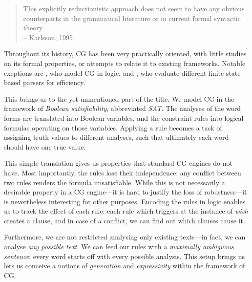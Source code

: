 \begin{quote}
This explicitly reductionistic approach does not seem to have any obvious counterparts in the grammatical literature or in current formal syntactic theory. \\
-- Karlsson, 1995
\end{quote}

Throughout its history, CG has been very practically oriented, with 
little studies on its formal properties, or attempts to relate it to existing
frameworks.
Notable exeptions are \cite{lager_nivre01}, who model CG in logic, and \cite{nemeskey14}, who evaluate different finite-state based parsers for efficiency.


This brings us to the yet unmentioned part of the title.
We model CG in the framework of \emph{Boolean satisfiability}, abbreviated \emph{SAT}.
The analyses of the word forms are translated into Boolean variables, 
and the constraint rules into logical formulas operating on those variables.
Applying a rule becomes a task of assigning truth values to different analyses,
such that ultimately each word should have one true value.

This simple translation gives us properties that standard CG engines do not have.
Most importantly, the rules lose their independence: any conflict between two rules renders the formula unsatisfiable.
While this is not necessarily a desirable property in a CG engine---it is hard to justify the loss of robustness---it is nevertheless interesting for other purposes. 
Encoding the rules in logic enables us to track the effect of each rule: each rule which triggers at the instance of \emph{wish} creates a clause, and in case of a 
conflict, we can find out which clauses cause it.

Furthermore, we are not restricted analysing only existing texts---in fact, we can analyse \emph{any possible text}. We can feed our rules with a \emph{maximally ambiguous sentence}: every word starts off with every possible analysis.
This setup brings us lets us conceive a notions of \emph{generation} and \emph{expressivity} within the framework of CG.



